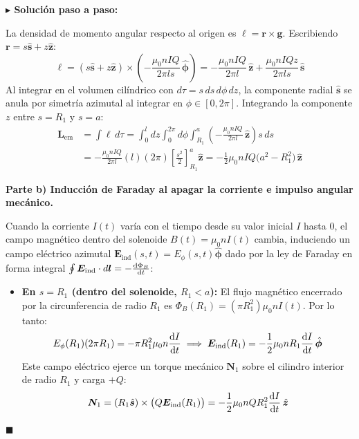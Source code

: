 \documentclass[11pt,a4paper]{book}
\newenvironment{solucion}{%
    \par\medskip\noindent\textbf{\color{blue!65!black}\Large $\blacktriangleright$ Solución paso a paso:}\par\medskip
}{%
    \hfill$\blacksquare$\par\bigskip
}
\newcommand{\phihat}{\hat{\bm{\phi}}}
\newcommand{\shat}{\hat{\bm{s}}}
\newcommand{\zhat}{\hat{\bm{z}}}
\newcommand{\Evec}{\bm{E}}
\begin{document}
\begin{solucion}
La densidad de momento angular respecto al origen es $\bm{\ell} = \bm{r} \times \bm{g}$. Escribiendo $\bm{r} = s\shat + z\zhat$:
\begin{equation}
    \bm{\ell} = (s\shat + z\zhat) \times \left(-\frac{\mu_0 n I Q}{2\pi l s}\,\phihat\right) = -\frac{\mu_0 n I Q}{2\pi l}\,\zhat + \frac{\mu_0 n I Q z}{2\pi l s}\,\shat
\end{equation}
Al integrar en el volumen cilíndrico con $d\tau = s\,ds\,d\phi\,dz$, la componente radial $\shat$ se anula por simetría azimutal al integrar en $\phi \in [0, 2\pi]$. Integrando la componente $z$ entre $s = R_1$ y $s = a$:
\begin{align}
    \bm{L}_{\text{em}} &= \int \bm{\ell}\,d\tau = \int_{0}^{l} dz \int_{0}^{2\pi} d\phi \int_{R_1}^{a} \left(-\frac{\mu_0 n I Q}{2\pi l}\,\zhat\right) s\,ds \nonumber \\
    &= -\frac{\mu_0 n I Q}{2\pi l} (l) (2\pi) \left[ \frac{s^2}{2} \right]_{R_1}^{a} \zhat = -\frac{1}{2}\mu_0 n I Q \big(a^2 - R_1^2\big)\,\zhat
\end{align}

\medskip
\textbf{Parte b) Inducción de Faraday al apagar la corriente e impulso angular mecánico.}

Cuando la corriente $I(t)$ varía con el tiempo desde su valor inicial $I$ hasta $0$, el campo magnético dentro del solenoide $B(t) = \mu_0 n I(t)$ cambia, induciendo un campo eléctrico azimutal $\Evec_{\text{ind}}(s,t) = E_\phi(s,t)\phihat$ dado por la ley de Faraday en forma integral $\oint \Evec_{\text{ind}} \cdot d\bm{l} = -\dv{\Phi_B}{t}$:
\begin{itemize}
    \item \textbf{En $s = R_1$ (dentro del solenoide, $R_1 < a$):} El flujo magnético encerrado por la circunferencia de radio $R_1$ es $\Phi_B(R_1) = (\pi R_1^2) \mu_0 n I(t)$. Por lo tanto:
    \begin{equation}
        E_\phi(R_1) (2\pi R_1) = -\pi R_1^2 \mu_0 n \dv{I}{t} \implies \Evec_{\text{ind}}(R_1) = -\frac{1}{2}\mu_0 n R_1 \dv{I}{t}\,\phihat
    \end{equation}
    Este campo eléctrico ejerce un torque mecánico $\bm{N}_1$ sobre el cilindro interior de radio $R_1$ y carga $+Q$:
    \begin{equation}
        \bm{N}_1 = (R_1\shat) \times \big(Q \Evec_{\text{ind}}(R_1)\big) = -\frac{1}{2}\mu_0 n Q R_1^2 \dv{I}{t}\,\zhat
    \end{equation}


\end{itemize}
\end{solucion}
\end{document}
